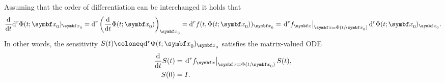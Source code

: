 Assuming that the order of differentiation can be interchanged it holds that
\begin{equation}
  \frac{\mathrm{d}}{\mathrm{d}t} \mathrm{d}^r \Phi(t; \x_0)_{\x_0} = \mathrm{d}^{r} \left( \frac{\mathrm{d}}{\mathrm{d}t} \Phi(t; \x_{0}) \right)_{\x_0} = \mathrm{d}^{r} f(t, \Phi(t; \x_{0}))_{\x_0} = \left. \mathrm{d}^{r} f_{\x} \right|_{\x = \Phi(t; \x_{0})} \mathrm{d}^{r} \Phi(t; \x_{0})_{\x_{0}}.
\end{equation}
In other words, the sensitivity $S(t) \coloneq \mathrm{d}^r \Phi(t; \x_{0})_{\x_{0}}$ satisfies the matrix-valued ODE
\begin{equation}
  \begin{aligned}
    \frac{\mathrm{d}}{\mathrm{d}t} S(t) & = \left. \mathrm{d}^{r} f_{\x} \right|_{\x = \Phi(t; \x_{0})} S(t), \\
    S(0) & = I.
  \end{aligned}
\end{equation}


